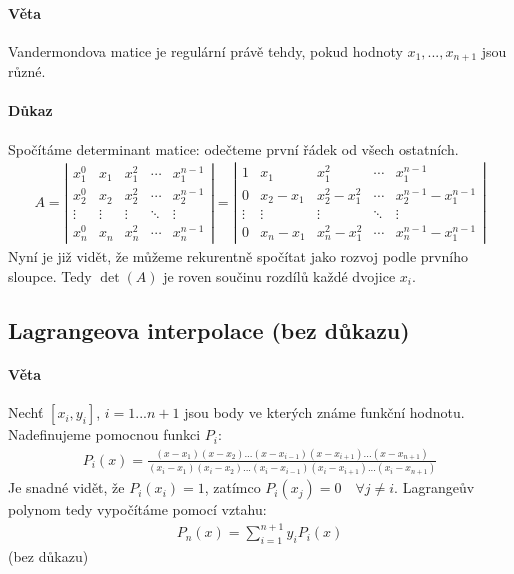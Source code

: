 \documentclass[a4paper,10pt]{article}
\begin{document}
\paragraph{Věta}
Vandermondova matice je regulární právě tehdy, pokud hodnoty $x_1, ..., x_{n+1}$
jsou různé.
\paragraph{Důkaz}
Spočítáme determinant matice: odečteme první řádek od všech ostatních.
\begin{align}
	A = 
	\left|
	\begin{matrix}
		x_1^0 & x_1 & x^2_1 & \cdots & x^{n-1}_1 \\
		x_2^0 & x_2 & x^2_2 & \cdots & x^{n-1}_2 \\
		\vdots & \vdots & \vdots & \ddots & \vdots \\
		x_n^0 & x_n & x^2_n & \cdots & x^{n-1}_n
	\end{matrix}
	\right| =
	\left|
	\begin{matrix}
		1 & x_1       & x^2_1        & \cdots & x^{n-1}_1 \\
		0 & x_2 - x_1 & x^2_2 -x^2_1 & \cdots & x^{n-1}_2 -x^{n-1}_1\\
		\vdots & \vdots & \vdots & \ddots & \vdots \\
		0 & x_n - x_1 & x^2_n -x^2_1 & \cdots & x^{n-1}_n - x^{n-1}_1
	\end{matrix}
	\right|
\end{align}
Nyní je již vidět, že můžeme rekurentně spočítat jako rozvoj podle prvního
sloupce. Tedy $\det(A)$ je roven součinu rozdílů každé dvojice $x_i$.


\subsection{Lagrangeova interpolace (bez důkazu)}
\setcounter{equation}{0}
\paragraph{Věta}
Nechť $[x_i, y_i]$, $i = 1 ... n+1$ jsou body ve kterých známe funkční hodnotu.
Nadefinujeme pomocnou funkci $P_i$:
\begin{align*}
	P_i(x) = \frac{(x-x_1)(x-x_2) ... (x-x_{i-1})(x-x_{i+1}) ...
	(x-x_{n+1})}{(x_i - x_1)(x_i - x_2) ... (x_i - x_{i-1})(x_i - x_{i+1}) ...
	(x_i - x_{n+1})}
\end{align*}
Je snadné vidět, že $P_i(x_i) = 1$, zatímco $P_i(x_j) = 0 \quad \forall j \neq
i$. Lagrangeův polynom tedy vypočítáme pomocí vztahu:
\begin{align*}
	P_n(x) = \sum_{i=1}^{n+1} y_i P_i(x)
\end{align*}
(bez důkazu)
\end{document}
